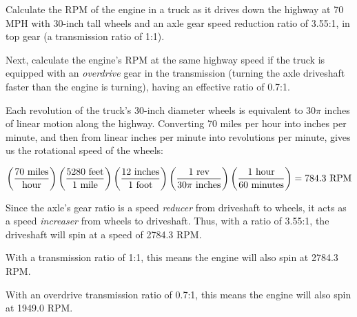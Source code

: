 

Calculate the RPM of the engine in a truck as it drives down the highway at 70 MPH with 30-inch tall wheels and an axle gear speed reduction ratio of 3.55:1, in top gear (a transmission ratio of 1:1).

\vskip 10pt

Next, calculate the engine's RPM at the same highway speed if the truck is equipped with an {\it overdrive} gear in the transmission (turning the axle driveshaft faster than the engine is turning), having an effective ratio of 0.7:1.







Each revolution of the truck's 30-inch diameter wheels is equivalent to $30 \pi$ inches of linear motion along the highway.  Converting 70 miles per hour into inches per minute, and then from linear inches per minute into revolutions per minute, gives us the rotational speed of the wheels:

$$\left(70 \hbox{ miles} \over \hbox{hour} \right) \left(5280 \hbox{ feet} \over 1 \hbox{ mile} \right) \left(12 \hbox{ inches} \over 1 \hbox{ foot} \right) \left(1 \hbox{ rev} \over 30 \pi \hbox{ inches} \right) \left(1 \hbox{ hour} \over 60 \hbox{ minutes} \right) = 784.3 \hbox{ RPM}$$

Since the axle's gear ratio is a speed {\it reducer} from driveshaft to wheels, it acts as a speed {\it increaser} from wheels to driveshaft.  Thus, with a ratio of 3.55:1, the driveshaft will spin at a speed of 2784.3 RPM.
 
\vskip 10pt

With a transmission ratio of 1:1, this means the engine will also spin at 2784.3 RPM.

\vskip 10pt

With an overdrive transmission ratio of 0.7:1, this means the engine will also spin at 1949.0 RPM.











